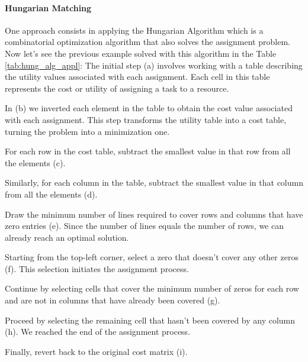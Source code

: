 \paragraph{Hungarian Matching}
One approach consists in applying the Hungarian Algorithm which is a combinatorial optimization algorithm that also solves the assignment problem.\\
Now let's see the previous example solved with this algorithm in the Table \ref{tab:hung_alg_appl}:
The initial step (a) involves working with a table describing the utility values associated with each assignment. Each cell in this table represents the cost or utility of assigning a task to a resource.

In (b) we inverted each element in the table to obtain the cost value associated with each assignment. This step transforms the utility table into a cost table, turning the problem into a minimization one.

For each row in the cost table, subtract the smallest value in that row from all the elements (c).

Similarly, for each column in the table, subtract the smallest value in that column from all the elements (d).

Draw the minimum number of lines required to cover rows and columns that have zero entries (e). Since the number of lines equals the number of rows, we can already reach an optimal solution.

Starting from the top-left corner, select a zero that doesn't cover any other zeros (f). This selection initiates the assignment process.

Continue by selecting cells that cover the minimum number of zeros for each row and are not in columns that have already been covered (g).

Proceed by selecting the remaining cell that hasn't been covered by any column (h). We reached the end of the assignment process.

Finally, revert back to the original cost matrix (i).

